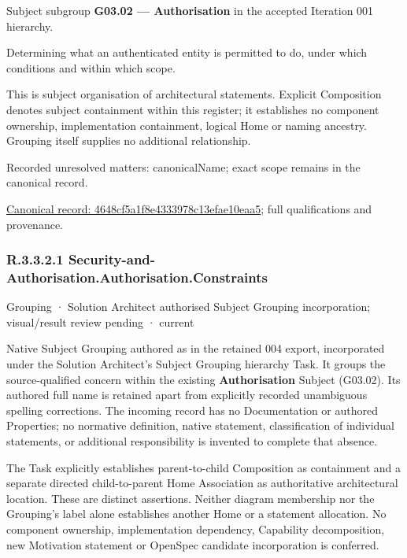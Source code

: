Subject subgroup \textbf{G03.02 — Authorisation} in the accepted Iteration 001 hierarchy.



Determining what an authenticated entity is permitted to do, under which conditions and within which scope.



This is subject organisation of architectural statements. Explicit Composition denotes subject containment within this register; it establishes no component ownership, implementation containment, logical Home or naming ancestry. Grouping itself supplies no additional relationship.


{\small Recorded unresolved matters: canonicalName; exact scope remains in the canonical record.}\par
{\footnotesize \href{../../../../continuum/grouping/4648cf5a1f8e4333978c13efae10eaa5.md}{Canonical record: 4648cf5a1f8e4333978c13efae10eaa5}; full qualifications and provenance.}\par
\subsubsection*{R.3.3.2.1 Security-and-Authorisation.Authorisation.Constraints}
\label{navigation:R.3.3.2.1}

\label{element:c0ef85ab954f447fb244149dfcc44aad}
{\small Grouping · Solution Architect authorised Subject Grouping incorporation; visual/result review pending · current}\par

Native Subject Grouping authored as \texttt{} in the retained 004 export,
incorporated under the Solution Architect's Subject Grouping hierarchy Task.
It groups the source-qualified \texttt{} concern within
the existing \textbf{Authorisation} Subject (G03.02). Its authored full name
is retained apart from explicitly recorded unambiguous spelling corrections.
The incoming record has no Documentation or authored Properties; no normative
definition, native statement, classification of individual statements, or
additional responsibility is invented to complete that absence.



The Task explicitly establishes parent-to-child Composition as containment and
a separate directed child-to-parent Home Association as authoritative architectural
location. These are distinct assertions. Neither diagram membership nor the
Grouping's label alone establishes another Home or a statement allocation.
No component ownership, implementation dependency, Capability decomposition,
new Motivation statement or OpenSpec candidate incorporation is conferred.



